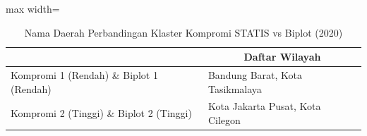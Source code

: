 \begin{table}[H]
\centering
\caption{Nama Daerah Perbandingan Klaster Kompromi STATIS vs Biplot (2020)} \label{tab:sample2biplot_comp_name_2020}
\begin{adjustbox}{max width=\textwidth}
\begin{tabular}{|>{\centering\arraybackslash}p{4cm}|p{10cm}|}
\hline
\multicolumn{1}{|c|}{\textbf{Kategori}} & \multicolumn{1}{c|}{\textbf{Daftar Wilayah}} \\
\hline
Kompromi 1 (Rendah) \& Biplot 1 (Rendah) & Bandung Barat, Kota Tasikmalaya \\
\hline
Kompromi 2 (Tinggi) \& Biplot 2 (Tinggi) & Kota Jakarta Pusat, Kota Cilegon \\
\hline
\end{tabular}
\end{adjustbox}
\end{table}